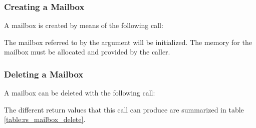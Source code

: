 \subsubsection{Creating a Mailbox}

A mailbox is created by means of the following call:


The mailbox referred to by the  argument will be initialized. The
memory for the mailbox must be allocated and provided by the caller.

\subsubsection{Deleting a Mailbox}

A mailbox can be deleted with the following call:


The different return values that this call can produce are summarized in
table \ref{table:rs_mailbox_delete}.

